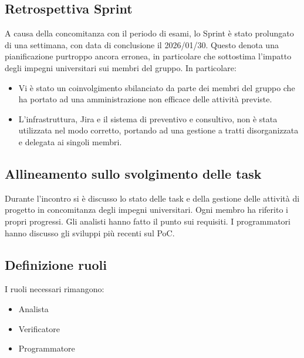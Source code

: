 \documentclass[a4paper,12pt]{article}
\begin{document}
\subsection{Retrospettiva Sprint}
A causa della concomitanza con il periodo di esami, lo Sprint è stato prolungato di una settimana, con data di conclusione il 2026/01/30. Questo denota una pianificazione purtroppo ancora erronea, in particolare che sottostima l'impatto degli impegni universitari sui membri del gruppo. 
In particolare:
\begin{itemize}
    \item Vi è stato un coinvolgimento sbilanciato da parte dei membri del gruppo che ha portato ad una amministrazione non efficace delle attività previste.
    \item L'infrastruttura, Jira e il sistema di preventivo e consultivo, non è stata utilizzata nel modo corretto, portando ad una gestione a tratti disorganizzata e delegata ai singoli membri.
\end{itemize}

\subsection{Allineamento sullo svolgimento delle task}
Durante l'incontro si è discusso lo stato delle task e della gestione delle attività di progetto in concomitanza degli impegni universitari. Ogni membro ha riferito i propri progressi. Gli analisti hanno fatto il punto sui requisiti. I programmatori hanno discusso gli sviluppi più recenti sul PoC.

\subsection{Definizione ruoli}
I ruoli necessari rimangono:
\begin{itemize}[noitemsep]
    \item Analista
    \item Verificatore
    \item Programmatore
\end{itemize}
\end{document}
